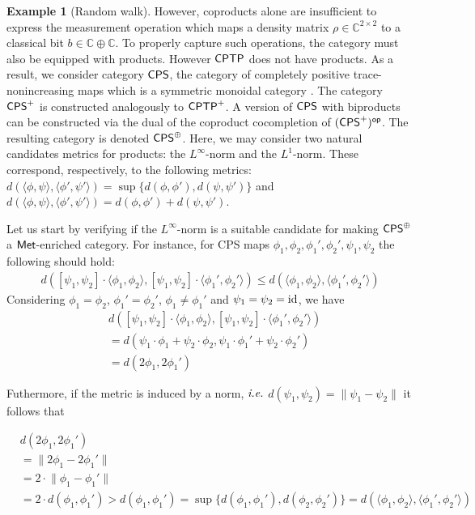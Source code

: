 \documentclass[10pt,a4paper]{amsart}
\theoremstyle{definition}
\theoremstyle{definition}
\newtheorem{example}[definition]{Example}
\theoremstyle{definition}
\theoremstyle{definition}
\theoremstyle{definition}
\theoremstyle{definition}
\begin{document}
\begin{example}[Random walk]
However, coproducts alone are insufficient to express the measurement operation which maps a density matrix $ \rho \in \mathbb{C}^{2 \times 2}$ to a classical bit $b \in \mathbb{C} \oplus \mathbb{C}$. To properly capture such operations, the category must also be equipped with products. However $\mathsf{CPTP}$ does not have products. As a result, we consider category $\mathsf{CPS}$, the category of completely positive trace-nonincreasing maps which is a symmetric monoidal category  \cite{selinger04}. The category $\mathsf{CPS}^{+}$ is constructed analogously to $\mathsf{CPTP}^{+}$. A version of $\mathsf{CPS}$ with biproducts can be constructed via the dual of the coproduct cocompletion of $(\mathsf{CPS}^{+})^{\mathsf{op}}$.  The resulting category is denoted $\mathsf{CPS}^{\oplus}$. Here, we may consider two natural candidates metrics for products: the $L^{\infty}$-norm and the $L^{1}$-norm. These correspond, respectively, to the following metrics: $d(\langle \phi, \psi \rangle, \langle \phi', \psi' \rangle ) = \sup \{ d(\phi, \phi' ), d(\psi, \psi') \}$ and $d(\langle \phi, \psi \rangle, \langle \phi', \psi' \rangle ) = d(\phi, \phi' ) +  d(\psi, \psi') $.

Let us start by verifying if the  $L^{\infty}$-norm is a suitable candidate for making $\mathsf{CPS}^{\oplus}$ a $\mathsf{Met}$-enriched category. For instance, for CPS maps $\phi_1, \phi_2,  \phi_1', \phi_2', \psi_1, \psi_2$ the following should hold:
\begin{align*}
  d([\psi_1, \psi_2] \cdot \langle \phi_1, \phi_2 \rangle, [\psi_1, \psi_2] \cdot \langle \phi_1', \phi_2' \rangle ) \leq d(\langle \phi_1, \phi_2 \rangle, \langle \phi_1', \phi_2' \rangle )
\end{align*}
Considering $\phi_1=\phi_2$, $\phi_1'=\phi_2'$, $\phi_1 \neq \phi_1'$ and $\psi_1= \psi_2 = \mathrm{id}$, we have
\begin{align*}
  & d([\psi_1, \psi_2] \cdot \langle \phi_1, \phi_2 \rangle, [\psi_1, \psi_2] \cdot \langle \phi_1', \phi_2' \rangle ) \\
  & = d(\psi_1 \cdot \phi_1 + \psi_2 \cdot \phi_2, \psi_1 \cdot \phi_1' + \psi_2 \cdot \phi_2') \\
  & = d(2 \phi_1, 2 \phi_1') 
\end{align*}

Futhermore, if the metric is induced by a norm, $\emph{i.e.}$ $d (\psi_1, \psi_2) = \lVert \psi_1 - \psi_2\lVert$ it follows that

\begin{align*}
  & d(2 \phi_1, 2 \phi_1') \\
  & = \lVert 2 \phi_1 - 2 \phi_1' \lVert \\
  & = 2 \cdot \lVert \phi_1 - \phi_1' \lVert \\
  & = 2 \cdot  d(\phi_1, \phi_1') > d(\phi_1, \phi_1') = \sup \{d(\phi_1, \phi_1'), d(\phi_2, \phi_2')\} = d(\langle \phi_1, \phi_2 \rangle, \langle \phi_1', \phi_2' \rangle )
\end{align*}


\end{example}
\end{document}
